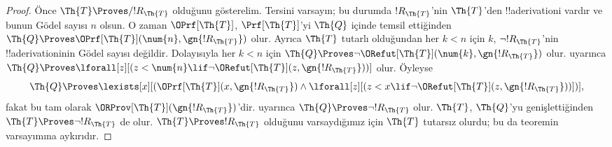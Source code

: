 \begin{proof}
Önce $\Th{T} \Proves/ !R_{\Th{T}}$ olduğunu gösterelim. Tersini varsayın;
bu durumda $!R_{\Th{T}}$'nin $\Th{T}$'den !!a{derivation}{}i vardır ve bunun
G\"odel sayısı $n$ olsun. O zaman $\OPrf[\Th{T}]$, $\Prf[\Th{T}]$'yi
$\Th{Q}$ içinde temsil ettiğinden
$\Th{Q} \Proves \OPrf[\Th{T}](\num{n},\gn{!R_{\Th{T}}})$ olur. Ayrıca
$\Th{T}$ tutarlı olduğundan her $k<n$ için $k$, $\lnot !R_{\Th{T}}$'nin
!!a{derivation}{}inin G\"odel sayısı değildir. Dolayısıyla her $k<n$ için
$\Th{Q} \Proves \lnot \ORefut[\Th{T}](\num{k},\gn{!R_{\Th{T}}})$ olur.
 uyarınca
$\Th{Q} \Proves \lforall[z][(z < \num{n} \lif \lnot \ORefut[\Th{T}](z,
  \gn{!R_{\Th{T}}}))]$ olur. Öyleyse
\[
\Th{Q} \Proves \lexists[x][(\OPrf[\Th{T}](x,\gn{!R_{\Th{T}}}) \land \lforall[z][(z
    < x \lif \lnot \ORefut[\Th{T}](z,\gn{!R_{\Th{T}}}))])],
\]
fakat bu tam olarak $\ORProv[\Th{T}](\gn{!R_{\Th{T}}})$'dir. 
uyarınca $\Th{Q} \Proves \lnot !R_{\Th{T}}$ olur. $\Th{T}$, $\Th{Q}$'yu
genişlettiğinden $\Th{T} \Proves \lnot !R_{\Th{T}}$ de olur.
$\Th{T} \Proves !R_{\Th{T}}$ olduğunu varsaydığımız için $\Th{T}$ tutarsız
olurdu; bu da teoremin varsayımına aykırıdır.


\end{proof}
